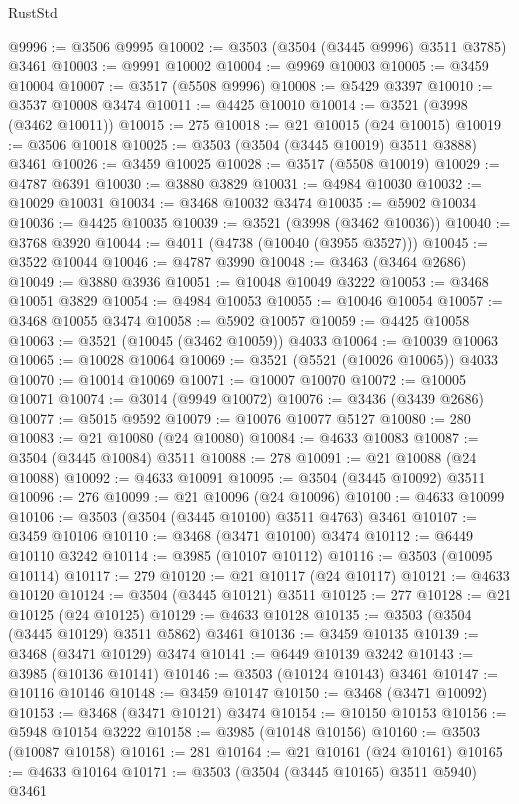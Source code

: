 \begin{lexlean}{RustStd}
\begin{coremodule}
@9996 := @3506 @9995
@10002 := @3503 (@3504 (@3445 @9996) @3511 @3785) @3461
@10003 := @9991 @10002
@10004 := @9969 @10003
@10005 := @3459 @10004
@10007 := @3517 (@5508 @9996)
@10008 := @5429 @3397
@10010 := @3537 @10008 @3474
@10011 := @4425 @10010
@10014 := @3521 (@3998 (@3462 @10011))
@10015 := 275
@10018 := @21 @10015 (@24 @10015)
@10019 := @3506 @10018
@10025 := @3503 (@3504 (@3445 @10019) @3511 @3888) @3461
@10026 := @3459 @10025
@10028 := @3517 (@5508 @10019)
@10029 := @4787 @6391
@10030 := @3880 @3829
@10031 := @4984 @10030
@10032 := @10029 @10031
@10034 := @3468 @10032 @3474
@10035 := @5902 @10034
@10036 := @4425 @10035
@10039 := @3521 (@3998 (@3462 @10036))
@10040 := @3768 @3920
@10044 := @4011 (@4738 (@10040 (@3955 @3527)))
@10045 := @3522 @10044
@10046 := @4787 @3990
@10048 := @3463 (@3464 @2686)
@10049 := @3880 @3936
@10051 := @10048 @10049 @3222
@10053 := @3468 @10051 @3829
@10054 := @4984 @10053
@10055 := @10046 @10054
@10057 := @3468 @10055 @3474
@10058 := @5902 @10057
@10059 := @4425 @10058
@10063 := @3521 (@10045 (@3462 @10059)) @4033
@10064 := @10039 @10063
@10065 := @10028 @10064
@10069 := @3521 (@5521 (@10026 @10065)) @4033
@10070 := @10014 @10069
@10071 := @10007 @10070
@10072 := @10005 @10071
@10074 := @3014 (@9949 @10072)
@10076 := @3436 (@3439 @2686)
@10077 := @5015 @9592
@10079 := @10076 @10077 @5127
@10080 := 280
@10083 := @21 @10080 (@24 @10080)
@10084 := @4633 @10083
@10087 := @3504 (@3445 @10084) @3511
@10088 := 278
@10091 := @21 @10088 (@24 @10088)
@10092 := @4633 @10091
@10095 := @3504 (@3445 @10092) @3511
@10096 := 276
@10099 := @21 @10096 (@24 @10096)
@10100 := @4633 @10099
@10106 := @3503 (@3504 (@3445 @10100) @3511 @4763) @3461
@10107 := @3459 @10106
@10110 := @3468 (@3471 @10100) @3474
@10112 := @6449 @10110 @3242
@10114 := @3985 (@10107 @10112)
@10116 := @3503 (@10095 @10114)
@10117 := 279
@10120 := @21 @10117 (@24 @10117)
@10121 := @4633 @10120
@10124 := @3504 (@3445 @10121) @3511
@10125 := 277
@10128 := @21 @10125 (@24 @10125)
@10129 := @4633 @10128
@10135 := @3503 (@3504 (@3445 @10129) @3511 @5862) @3461
@10136 := @3459 @10135
@10139 := @3468 (@3471 @10129) @3474
@10141 := @6449 @10139 @3242
@10143 := @3985 (@10136 @10141)
@10146 := @3503 (@10124 @10143) @3461
@10147 := @10116 @10146
@10148 := @3459 @10147
@10150 := @3468 (@3471 @10092)
@10153 := @3468 (@3471 @10121) @3474
@10154 := @10150 @10153
@10156 := @5948 @10154 @3222
@10158 := @3985 (@10148 @10156)
@10160 := @3503 (@10087 @10158)
@10161 := 281
@10164 := @21 @10161 (@24 @10161)
@10165 := @4633 @10164
@10171 := @3503 (@3504 (@3445 @10165) @3511 @5940) @3461

\end{coremodule}
\end{lexlean}
